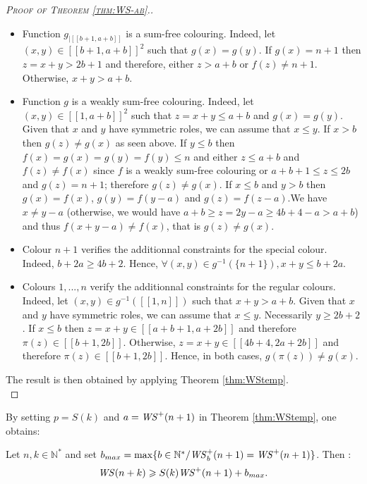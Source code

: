 \begin{proof}[\textsc{Proof of Theorem \ref{thm:WS-ab}.}]
\begin{itemize}
\item Function \(g_{|[\![b + 1, a + b]\!]}\) is a sum-free colouring. Indeed, let \((x, y) \in 
	[\![b + 1, a + b]\!]^2\) such that \(g(x) = g(y)\). If \(g(x) = n + 1\) then \(z = x + y > 2 b + 1\) 
	and therefore, either \(z > a + b\) or \(f(z) \neq n + 1\). Otherwise, \(x + y > a + b\).
\item Function \(g\) is a weakly sum-free colouring. Indeed, let \((x, y) \in [\![1, a + b]\!]^2\) such that 
	\(z = x + y \leqslant a + b\) and \(g(x) = g(y)\). Given that \(x\) and \(y\) have symmetric roles, 
	we can assume that \(x \leqslant y\). If \(x > b\) then \(g(z) \neq g(x)\) as seen above. If \(y \leqslant b\) then 
	\(f(x) = g(x) = g(y) = f(y) \leqslant n\) and either \(z \leqslant a + b\) and \(f(z) \neq f(x)\) since \(f\) is a weakly 
	sum-free colouring or \(a + b + 1 \leqslant z \leqslant 2 b\) and \(g(z) = n + 1\); therefore \(g(z) \neq g(x)\). If 
	\(x \leqslant b\) and \(y > b\) then \(g(x) = f(x)\), \(g(y) = f(y - a)\) and \(g(z) = f(z - a)\).We have \(x \neq y - a\) 
	(otherwise, we would have \(a + b \geqslant z = 2 y  - a \geqslant 4 b + 4 - a > a + b\)) and thus \(f(x + y - a) \neq f(x)\),
	that is \(g(z) \neq g(x)\).
\item Colour \(n + 1\) verifies the additionnal constraints for the special colour. Indeed, \(b + 2 a \geqslant 4 b + 2\). 
	Hence, \(\forall (x, y) \in g^{-1}(\{n + 1\}), x + y \leqslant b + 2 a\).
\item Colours \(1, ..., n\) verify the additionnal constraints for the regular colours. Indeed, let 
	\((x, y) \in g^{-1}([\![1, n]\!])\) such that \(x + y > a + b\). Given that \(x\) and \(y\) have symmetric roles, 
	we can assume that \(x \leqslant y\). Necessarily \(y \geqslant 2 b + 2\). If \(x \leqslant b\) then 
	\(z = x + y \in [\![a + b + 1, a + 2 b]\!]\) and therefore \(\pi(z) \in [\![b + 1, 2 b]\!]\). Otherwise, 
	\(z = x + y \in [\![4 b + 4, 2 a + 2 b]\!]\) and therefore \(\pi(z) \in [\![b + 1, 2 b]\!]\). Hence, in both cases, 
	\(g(\pi(z)) \neq g(x)\).
\end{itemize}

The result is then obtained by applying Theorem \ref{thm:WStemp}. \\
\end{proof}

By setting \(p = S(k)\) and \(a = \mathit{WS}^+(n + 1)\) in Theorem \ref{thm:WStemp}, one obtains:

\begin{corollary}
\label{cor:ineqWS+}
Let \(n,k \in \mathbb{N}^*\) and set \( b_{max} = \max \{b\in \mathbb{N}^*/ \mathit{WS}_b^+(n+1) = \mathit{WS}^+(n+1)\}\).
Then :
\[
\mathit{WS}(n+k) \geqslant S(k) \mathit{WS}^+(n+1)+b_{max}.
\]
\end{corollary}

